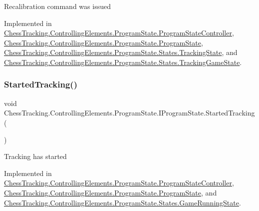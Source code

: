 Recalibration command was issued 



Implemented in \mbox{\hyperlink{class_chess_tracking_1_1_controlling_elements_1_1_program_state_1_1_program_state_controller_ae815016db915cdbf14a9705560038f19}{Chess\+Tracking.\+Controlling\+Elements.\+Program\+State.\+Program\+State\+Controller}}, \mbox{\hyperlink{class_chess_tracking_1_1_controlling_elements_1_1_program_state_1_1_program_state_a702ebae08f0615d645dfaa4334ea62fc}{Chess\+Tracking.\+Controlling\+Elements.\+Program\+State.\+Program\+State}}, \mbox{\hyperlink{class_chess_tracking_1_1_controlling_elements_1_1_program_state_1_1_states_1_1_tracking_state_a3a8001d1ae948604124652f58164fa89}{Chess\+Tracking.\+Controlling\+Elements.\+Program\+State.\+States.\+Tracking\+State}}, and \mbox{\hyperlink{class_chess_tracking_1_1_controlling_elements_1_1_program_state_1_1_states_1_1_tracking_game_state_a52925b07fb679d59e78b218c7c12d78c}{Chess\+Tracking.\+Controlling\+Elements.\+Program\+State.\+States.\+Tracking\+Game\+State}}.

\mbox{\label{interface_chess_tracking_1_1_controlling_elements_1_1_program_state_1_1_i_program_state_a6c68e5ce7c334b28439ae9bdc7462e8d}} 
\subsubsection{\texorpdfstring{StartedTracking()}{StartedTracking()}}
{\footnotesize\ttfamily void Chess\+Tracking.\+Controlling\+Elements.\+Program\+State.\+I\+Program\+State.\+Started\+Tracking (\begin{DoxyParamCaption}{ }\end{DoxyParamCaption})}



Tracking has started 



Implemented in \mbox{\hyperlink{class_chess_tracking_1_1_controlling_elements_1_1_program_state_1_1_program_state_controller_afd555f69a318ca50b76a7bd275daa904}{Chess\+Tracking.\+Controlling\+Elements.\+Program\+State.\+Program\+State\+Controller}}, \mbox{\hyperlink{class_chess_tracking_1_1_controlling_elements_1_1_program_state_1_1_program_state_a633786bcd19a9f94d568115db3cdb5d9}{Chess\+Tracking.\+Controlling\+Elements.\+Program\+State.\+Program\+State}}, and \mbox{\hyperlink{class_chess_tracking_1_1_controlling_elements_1_1_program_state_1_1_states_1_1_game_running_state_aa540a4f9c96114762fe08925d7cdc6de}{Chess\+Tracking.\+Controlling\+Elements.\+Program\+State.\+States.\+Game\+Running\+State}}.

